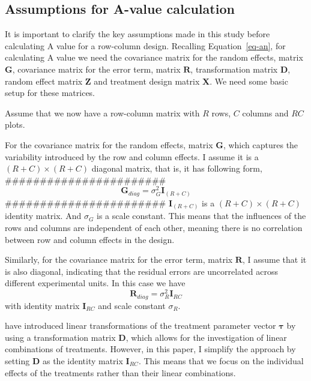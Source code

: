 \documentclass[
  a4paper,
  oneside,
  openany,
  12pt,
  onecolumn]{book}
\theoremstyle{plain}
\theoremstyle{definition}
\theoremstyle{remark}
\begin{document}
\subsection{Assumptions for A-value
calculation}\label{assumptions-for-a-value-calculation}

It is important to clarify the key assumptions made in this study before
calculating A value for a row-column design. Recalling
Equation~\ref{eq-an}, for calculating A value we need the covariance
matrix for the random effects, matrix \(\boldsymbol{G}\), covariance
matrix for the error term, matrix \(\boldsymbol{R}\), transformation
matrix \(\boldsymbol{D}\), random effect matrix \(\boldsymbol{Z}\) and
treatment design matrix \(\boldsymbol{X}\). We need some basic setup for
these matrices.

Assume that we now have a row-column matrix with \(R\) rows, \(C\)
columns and \(RC\) plots.

For the covariance matrix for the random effects, matrix
\(\boldsymbol{G}\), which captures the variability introduced by the row
and column effects. I assume it is a \((R+C)\times(R+C)\) diagonal
matrix, that is, it has following form,
\#\#\#\#\#\#\#\#\#\#\#\#\#\#\#\#\#\#\#\#\#\#\# \[
\boldsymbol{G}_{diag} = \sigma_{G}^2\boldsymbol{I}_{(R+C)}
\] \#\#\#\#\#\#\#\#\#\#\#\#\#\#\#\#\#\#\#\#\#\#\#
\(\boldsymbol{I}_{(R+C)}\) is a \((R+C)\times(R+C)\) identity matrix.
And \(\sigma_{G}\) is a scale constant. This means that the influences
of the rows and columns are independent of each other, meaning there is
no correlation between row and column effects in the design.

Similarly, for the covariance matrix for the error term, matrix
\(\boldsymbol{R}\), I assume that it is also diagonal, indicating that
the residual errors are uncorrelated across different experimental
units. In this case we have \[
\boldsymbol{R}_{diag} = \sigma_{R}^2\boldsymbol{I}_{RC}
\] with identity matrix \(\boldsymbol{I}_{RC}\) and scale constant
\(\sigma_{R}\).

\citet{butler2013optimal} have introduced linear transformations of the
treatment parameter vector \(\boldsymbol{\tau}\) by using a
transformation matrix \(\boldsymbol{D}\), which allows for the
investigation of linear combinations of treatments. However, in this
paper, I simplify the approach by setting \(\boldsymbol{D}\) as the
identity matrix \(\boldsymbol{I}_{RC}\). This means that we focus on the
individual effects of the treatments rather than their linear
combinations.
\end{document}
